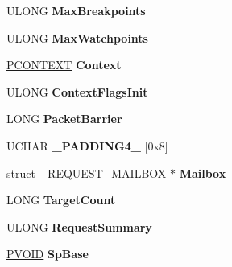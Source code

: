 \begin{DoxyCompactItemize}
\item 
\mbox{\label{struct___k_p_r_c_b_acfe67aab944860efe8eba52bfacfa2d1}} 
U\+L\+O\+NG {\bfseries Max\+Breakpoints}
\item 
\mbox{\label{struct___k_p_r_c_b_a141342c5a16ed8d38279192fee77b32b}} 
U\+L\+O\+NG {\bfseries Max\+Watchpoints}
\item 
\mbox{\label{struct___k_p_r_c_b_a88031e23f22e03439b3be7632aa97a8a}} 
\hyperlink{struct___c_o_n_t_e_x_t}{P\+C\+O\+N\+T\+E\+XT} {\bfseries Context}
\item 
\mbox{\label{struct___k_p_r_c_b_ac4885e26f58b9dc40bc650be7c5c71fe}} 
U\+L\+O\+NG {\bfseries Context\+Flags\+Init}
\item 
\mbox{\label{struct___k_p_r_c_b_a8158082df4037ae240ce44a3b1e32c7e}} 
L\+O\+NG {\bfseries Packet\+Barrier}
\item 
\mbox{\label{struct___k_p_r_c_b_a19a679b91be9973290e217c14875b64a}} 
U\+C\+H\+AR {\bfseries \+\_\+\+P\+A\+D\+D\+I\+N\+G4\+\_\+} \mbox{[}0x8\mbox{]}
\item 
\mbox{\label{struct___k_p_r_c_b_a289611e5a3133d09c5aa3e5d2fd56d37}} 
\hyperlink{interfacestruct}{struct} \hyperlink{struct___r_e_q_u_e_s_t___m_a_i_l_b_o_x}{\+\_\+\+R\+E\+Q\+U\+E\+S\+T\+\_\+\+M\+A\+I\+L\+B\+OX} $\ast$ {\bfseries Mailbox}
\item 
\mbox{\label{struct___k_p_r_c_b_a8368a22fc3266d8bdfc87bd623cfa318}} 
L\+O\+NG {\bfseries Target\+Count}
\item 
\mbox{\label{struct___k_p_r_c_b_af15824dedfbb4eaef6132400ca5caf88}} 
U\+L\+O\+NG {\bfseries Request\+Summary}
\item 
\mbox{\label{struct___k_p_r_c_b_a54d3394add111e5e051542b7c8f49a8c}} 
\hyperlink{interfacevoid}{P\+V\+O\+ID} {\bfseries Sp\+Base}
\item 
\mbox{\label{struct___k_p_r_c_b_a04e39c1278d05d5c58489785fd567a0f}} 

\end{DoxyCompactItemize}
